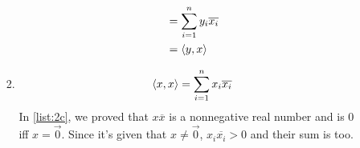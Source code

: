 \documentclass[12pt]{article}
\begin{document}
\begin{enumerate}
\begin{enumerate}
\begin{enumerate}
\begin{align*}
                                                                   & = \sum_{i=1}^{n} y_i \overline{x_i}            \\
                                                                   & = \braket{y, x}
                                    \end{align*}
                              \item \[\braket{x, x}=\sum_{i=1}^{n} x_i \overline{x_i}\]
                                    In \ref{list:2c}, we proved that $x\overline{x}$ is a nonnegative real number
                                    and is $0$ iff $x=\vec{0}$.
                                    Since it's given that $x \ne \vec{0}$, $x_i\overline{x_i}>0$ and their sum is too.
                        \end{enumerate}
            \end{enumerate}
\end{enumerate}
\end{document}
